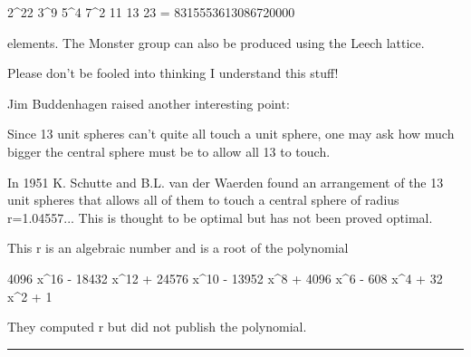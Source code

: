 2^{22} 3^{9} 5^{4} 7^{2} 11 13 23 = 8315553613086720000

elements.  The Monster group can also be produced using the Leech lattice.

Please don't be fooled into thinking I understand this stuff!

Jim Buddenhagen raised another interesting point:

Since 13 unit spheres can't quite all touch a unit sphere, one may ask how
much bigger the central sphere must be to allow all 13 to touch.
 
In 1951 K. Schutte and B.L. van der Waerden found an arrangement of the
13 unit spheres that allows all of them to touch a central sphere of radius
r=1.04557... This is thought to be optimal but has not been proved optimal.
 
This r is an algebraic number and is a root of the polynomial
 
4096 x^{16} - 18432 x^{12} + 24576 x^{10} - 13952 x^{8} + 4096 x^{6} - 608 x^{4} + 32 x^{2} + 1 
 
They computed r but did not publish the polynomial.


\par\noindent\rule{\textwidth}{0.4pt}
